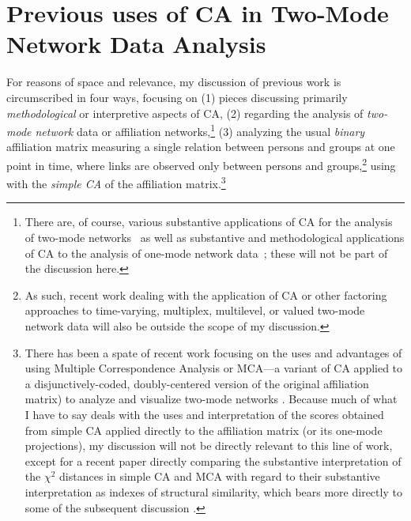 \documentclass[a4paper,fleqn]{cas-sc}
\begin{document}
\section{Previous uses of CA in Two-Mode Network Data Analysis} \label{sec:prevuses}

For reasons of space and relevance, my discussion of previous work is circumscribed in four ways, focusing on (1) pieces discussing primarily \textit{methodological} or interpretive aspects of CA, (2) regarding the analysis of \textit{two-mode network} data or affiliation networks,\footnote{There are, of course, various substantive applications of CA for the analysis of two-mode networks~\citep[e.g.,][]{breiger2000tool, faust2002scaling, schweizer1991power, serino2024mapping, ragozini2018analysis} as well as substantive and methodological applications of CA to the analysis of one-mode network data~\citep[e.g.,][]{noma1985scaling, kumbasar1994systematic, lizardo2020correspondence}; these will not be part of the discussion here.} (3) analyzing the usual \textit{binary} affiliation matrix measuring a single relation between persons and groups at one point in time, where links are observed only between persons and groups,\footnote{As such, recent work dealing with the application of CA or other factoring approaches to time-varying, multiplex, multilevel, or valued two-mode network data \citep{ragozini2014correspondence, ragozini2015multiple, zhu2016correspondence} will also be outside the scope of my discussion.} using with the \textit{simple CA} of the affiliation matrix.\footnote{There has been a spate of recent work focusing on the uses and advantages of using Multiple Correspondence Analysis or MCA---a variant of CA applied to a disjunctively-coded, doubly-centered version of the original affiliation matrix) to analyze and visualize two-mode networks \citep[e.g.,][]{dramalidis2016subset, desposito2014use, ragozini2014correspondence}. Because much of what I have to say deals with the uses and interpretation of the scores obtained from simple CA applied directly to the affiliation matrix (or its one-mode projections), my discussion will not be directly relevant to this line of work, except for a recent paper directly comparing the substantive interpretation of the $\chi^2$ distances in simple CA and MCA with regard to their substantive interpretation as indexes of structural similarity, which bears more directly to some of the subsequent discussion \citep{desposito2014comparison}.}

\end{document}
